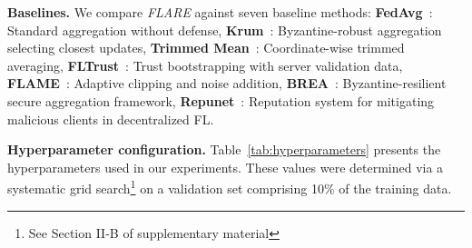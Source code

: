 \documentclass[lettersize,journal]{IEEEtran}
\begin{document}
{\textbf{Baselines.} We compare \textit{FLARE} against seven baseline methods:
\textbf{FedAvg}~\cite{pmlr-v54-mcmahan17a}: Standard aggregation without defense, \textbf{Krum}~\cite{blanchard2017machine}: Byzantine-robust aggregation selecting closest updates, \textbf{Trimmed Mean}~\cite{yin2018byzantine}: Coordinate-wise trimmed averaging, \textbf{FLTrust}~\cite{cao2020fltrust}: Trust bootstrapping with server validation data, \textbf{FLAME}~\cite{nguyen2022flame}: Adaptive clipping and noise addition, \textbf{BREA}~\cite{9276464}: Byzantine-resilient secure aggregation framework, \textbf{Repunet}~\cite{penalva2025repunet}:  Reputation system for mitigating malicious clients in decentralized FL.

\textbf{Hyperparameter configuration.} Table~\ref{tab:hyperparameters} presents the hyperparameters used in our experiments. These values were determined via a systematic grid search\footnote{See Section II-B of supplementary material} on a validation set comprising 10\% of the training data.

}
\end{document}

